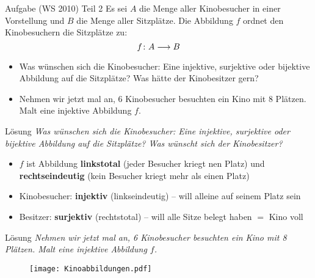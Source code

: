 \begin{frame}{Aufgabe (WS 2010) Teil 2}
	Es sei $A$ die Menge aller Kinobesucher in einer Vorstellung und $B$ die Menge aller Sitzplätze. Die Abbildung $f$ ordnet den Kinobesuchern die Sitzplätze zu:
	$$ f \colon A \longrightarrow B$$
	\begin{itemize}
		\item Was wünschen sich die Kinobesucher: Eine injektive, surjektive oder bijektive Abbildung auf die Sitzplätze? Was hätte der Kinobesitzer gern?
		\item Nehmen wir jetzt mal an, 6 Kinobesucher besuchten ein Kino mit 8 Plätzen. Malt eine injektive Abbildung $f$.
	\end{itemize}
	
\end{frame}

\begin{frame}{Lösung}
	\textit{Was wünschen sich die Kinobesucher: Eine injektive, surjektive oder bijektive Abbildung auf die Sitzplätze? Was wünscht sich der Kinobesitzer?} \\[2em] \pause
	\begin{itemize}[<+->]
		\item $f$ ist Abbildung \impl \textbf{linkstotal} (jeder Besucher kriegt nen Platz) und \textbf{rechtseindeutig} (kein Besucher kriegt mehr als einen Platz)
		\item Kinobesucher: \textbf{injektiv} (linkseindeutig) – will alleine auf seinem Platz sein
		\item Besitzer: \textbf{surjektiv} (rechtstotal) – will alle Sitze belegt haben $=$ Kino voll
	\end{itemize}
\end{frame}

\begin{frame}{Lösung}
	\textit{Nehmen wir jetzt mal an, 6 Kinobesucher besuchten ein Kino mit 8 Plätzen. Malt eine injektive Abbildung $f$.} \\[2em] \pause
	
	\begin{figure}[H]
		\centering
		\texttt{[image: Kinoabbildungen.pdf]}
	\end{figure}
\end{frame}

%	
%	


